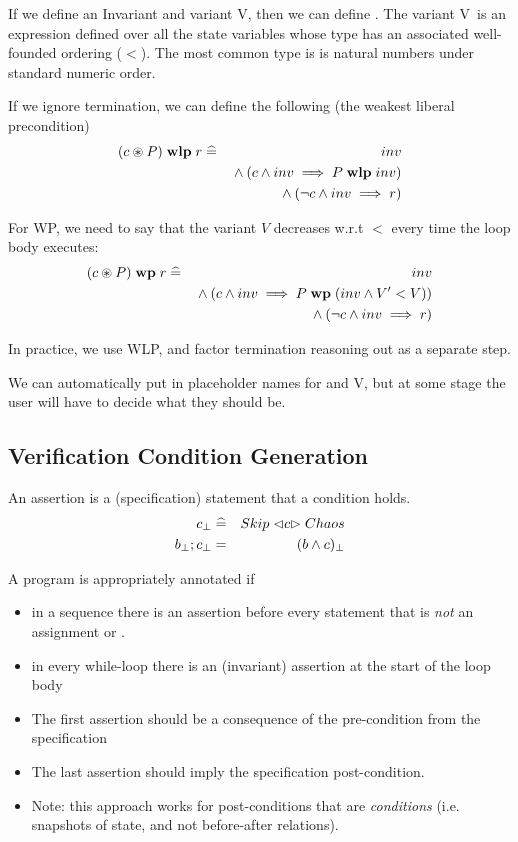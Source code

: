 If we define an Invariant  and variant \m V,
then we can define .
The variant \m V\ is an expression defined over all the state variables
whose type has an associated well-founded ordering ($<$).
The most common type is is natural numbers under standard numeric order.

If we ignore termination, we can define the following
(the weakest liberal precondition)
\begin{eqnarray*}
      (c \circledast P ) \mathrel{\mathbf{wlp}} r
      &\mathrel{\widehat=}&
      inv
    \\ && {} \land (c \land inv \implies P \mathrel{\mathbf{wlp}} inv)
    \\ && {} \land (\lnot c \land inv \implies r)
\end{eqnarray*}

For WP, we need to say that the variant $V$ decreases w.r.t $<$
every time the loop body executes:
\begin{eqnarray*}
      (c \circledast P ) \mathrel{\mathbf{wp}} r
      &\mathrel{\widehat=}&
      inv
    \\ && {} \land (c \land inv \implies P \mathrel{\mathbf{wp}} (inv \land V' < V))
    \\ && {} \land (\lnot c \land inv \implies r)
\end{eqnarray*}

In practice, we use WLP,
and factor termination reasoning out as a separate step.



We can automatically put in placeholder names for 
and \m V,
but at some stage the user will have to decide what they should be.

\newpage
\subsection{Verification Condition Generation}

An assertion  is a (specification)
statement that a condition holds.
\begin{eqnarray*}
   c_\bot &\mathrel{\widehat=}& Skip \mathrel{\lhd {c} \rhd} Chaos
\\ b_\bot ; c_\bot &=& (b \land c)_\bot
\end{eqnarray*}

A program is appropriately annotated if
\begin{itemize}
  \item
    in a sequence 
    there is an assertion before every statement that is
    \emph{not} an assignment or .
  \item
    in every while-loop there is an (invariant) assertion
    at the start of the loop body
  \item
    The first assertion should be a consequence of
    the  pre-condition from the specification
  \item
    The last assertion should imply the specification post-condition.
  \item
    Note: this approach works for post-conditions that are \emph{conditions}
    (i.e. snapshots of state, and not before-after relations).
\end{itemize}

